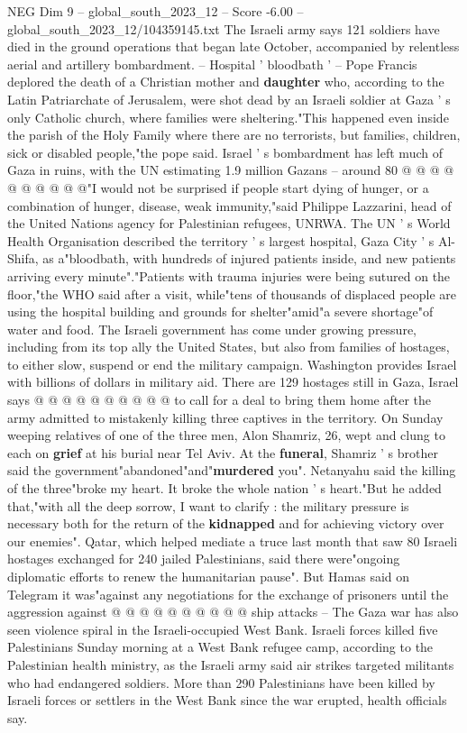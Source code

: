 \begin{textsample}{NEG Dim 9 – global\_south\_2023\_12 – Score -6.00 – global\_south\_2023\_12/104359145.txt}
The Israeli army says 121 soldiers have died in the ground operations that began late October, accompanied by relentless aerial and artillery bombardment. -- Hospital ' bloodbath ' -- Pope Francis deplored the death of a Christian mother and \textbf{daughter} who, according to the Latin Patriarchate of Jerusalem, were shot dead by an Israeli soldier at Gaza ' s only Catholic church, where families were sheltering."This happened even inside the parish of the Holy Family where there are no terrorists, but families, children, sick or disabled people,"the pope said.
Israel ' s bombardment has left much of Gaza in ruins, with the UN estimating 1.9 million Gazans -- around 80 @ @ @ @ @ @ @ @ @ @"I would not be surprised if people start dying of hunger, or a combination of hunger, disease, weak immunity,"said Philippe Lazzarini, head of the United Nations agency for Palestinian refugees, UNRWA.
The UN ' s World Health Organisation described the territory ' s largest hospital, Gaza City ' s Al-Shifa, as a"bloodbath, with hundreds of injured patients inside, and new patients arriving every minute"."Patients with trauma injuries were being sutured on the floor,"the WHO said after a visit, while"tens of thousands of displaced people are using the hospital building and grounds for shelter"amid"a severe shortage"of water and food.
The Israeli government has come under growing pressure, including from its top ally the United States, but also from families of hostages, to either slow, suspend or end the military campaign.
Washington provides Israel with billions of dollars in military aid.
There are 129 hostages still in Gaza, Israel says @ @ @ @ @ @ @ @ @ @ to call for a deal to bring them home after the army admitted to mistakenly killing three captives in the territory.
On Sunday weeping relatives of one of the three men, Alon Shamriz, 26, wept and clung to each on \textbf{grief} at his burial near Tel Aviv.
At the \textbf{funeral}, Shamriz ' s brother said the government"abandoned"and"\textbf{murdered} you".
Netanyahu said the killing of the three"broke my heart.
It broke the whole nation ' s heart."But he added that,"with all the deep sorrow, I want to clarify : the military pressure is necessary both for the return of the \textbf{kidnapped} and for achieving victory over our enemies".
Qatar, which helped mediate a truce last month that saw 80 Israeli hostages exchanged for 240 jailed Palestinians, said there were"ongoing diplomatic efforts to renew the humanitarian pause".
But Hamas said on Telegram it was"against any negotiations for the exchange of prisoners until the aggression against @ @ @ @ @ @ @ @ @ @ ship attacks -- The Gaza war has also seen violence spiral in the Israeli-occupied West Bank.
Israeli forces killed five Palestinians Sunday morning at a West Bank refugee camp, according to the Palestinian health ministry, as the Israeli army said air strikes targeted militants who had endangered soldiers.
More than 290 Palestinians have been killed by Israeli forces or settlers in the West Bank since the war erupted, health officials say.

\end{textsample}
